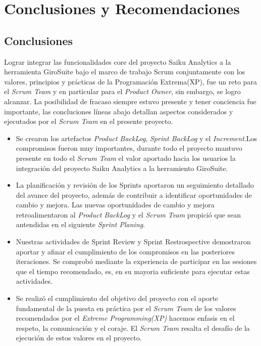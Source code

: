 \chapter{Conclusiones y Recomendaciones} \label{chapter:IV}
\begin{spacing}{1.5}
\section{Conclusiones}
Lograr integrar las funcionalidades core del proyecto Saiku Analytics a la herramienta GiroSuite bajo el marco de trabajo Scrum conjuntamente con los valores, principios y pr\'{a}cticas de la Programaci\'{o}n Extrema(XP), fue un reto para el \textit{Scrum Team} y en particular para el \textit{Product Owner}, sin embargo, se logro alcanzar. La posibilidad de fracaso siempre estuvo presente y tener conciencia fue importante, las concluciones l\'{i}neas abajo detallan aspectos considerados y ejecutados por el \textit{Scrum Team} en el presente proyecto.
\begin{itemize}
	
	\item Se crearon los artefactos \textit{Product BackLog}, \textit{Sprint BackLog} y el \textit{Increment}.Los compromisos fueron muy importantes, durante todo el proyecto mantuvo presente en todo el \textit{Scrum Team} el valor aportado hacia los usuarios la integraci\'{o}n del proyecto Saiku Analytics a la herramiento GiroSuite.
	
	\item La planificaci\'{o}n y revisi\'{o}n de los Sprints aportaron un seguimiento detallado del avance del proyecto, adem\'{a}s de contribuir a identificar oportunidades de cambio y mejora. Las nuevas oportunidades de cambio y mejora retroalimentaron al \textit{Product BackLog} y el \textit{Scrum Team} propici\'{o} que sean antendidas en el siguiente \textit{Sprint Planing}.
	
	\item Nuestras actividades de Sprint Review y Sprint Restrospective demostraron aportar y afinar el cumplimiento de los compromisos en las posteriores iteraciones. Se comprob\'{o} mediante la experiencia de participar en las sesiones que el tiempo recomendado, es, en su mayoria suficiente para ejecutar estas actividades.
	
	\item Se realiz\'{o} el cumplimiento del objetivo del proyecto con el aporte fundamental de la puesta en pr\'{a}ctica por el \textit{Scrum Team} de los valores recomendados por el \textit{Extreme Programming(XP)} hacemos enfasis en el respeto, la comunicaci\'{o}n y el coraje. El \textit{Scrum Team} resalta el desaf\'{i}o de la ejecuci\'{o}n de estos valores en el proyecto.
	

\end{itemize}
\end{spacing}
